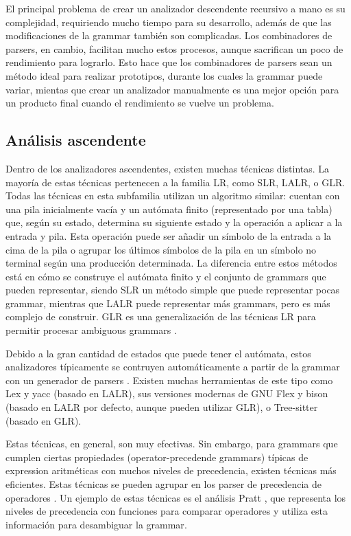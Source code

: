 El principal problema de crear un analizador descendente recursivo a mano es su
complejidad, requiriendo mucho tiempo para su desarrollo, además de que las
modificaciones de la \gls{grammar} también son complicadas. Los combinadores de
\glspl{parser}, en cambio, facilitan mucho estos procesos, aunque sacrifican un
poco de rendimiento para lograrlo. Esto hace que los combinadores de
\glspl{parser} sean un método ideal para realizar prototipos, durante los cuales
la \gls{grammar} puede variar, mientas que crear un analizador manualmente es
una mejor opción para un producto final cuando el rendimiento se vuelve un
problema.

\subsection{Análisis ascendente}

Dentro de los analizadores ascendentes, existen muchas técnicas distintas. La
mayoría de estas técnicas pertenecen a la familia LR, como SLR, LALR, o GLR.
Todas las técnicas en esta subfamilia utilizan un algoritmo similar: cuentan con
una pila inicialmente vacía y un autómata finito (representado por una tabla)
que, según su estado, determina su siguiente estado y la operación a aplicar a
la entrada y pila. Esta operación puede ser añadir un símbolo de la entrada a la
cima de la pila o agrupar los últimos símbolos de la pila en un símbolo no
terminal según una producción determinada. La diferencia entre estos métodos
está en cómo se construye el autómata finito y el conjunto de \glspl{grammar}
que pueden representar, siendo SLR un método simple que puede representar pocas
\gls{grammar}, mientras que LALR puede representar más \glspl{grammar}, pero es
más complejo de construir. \parencite{dragon-book} GLR es una generalización de
las técnicas LR para permitir procesar \glspl{ambiguous grammar}
\parencite{GLR-algorithm}.

Debido a la gran cantidad de estados que puede tener el autómata, estos
analizadores típicamente se contruyen automáticamente a partir de la
\gls{grammar} con un generador de \glspl{parser} \parencite{dragon-book}.
Existen muchas herramientas de este tipo como Lex y yacc \parencite{yacc}
(basado en LALR), sus versiones modernas de GNU Flex y bison \parencite{bison}
(basado en LALR por defecto, aunque pueden utilizar GLR), o Tree-sitter
\parencite{tree-sitter} (basado en GLR).

Estas técnicas, en general, son muy efectivas. Sin embargo, para \glspl{grammar}
que cumplen ciertas propiedades (\glspl{operator-precedende grammar}) típicas de
\gls{expression} aritméticas con muchos niveles de precedencia, existen técnicas
más eficientes. Estas técnicas se pueden agrupar en los \gls{parser} de
precedencia de operadores \parencite{operator-precedence-parser}. Un ejemplo de
estas técnicas es el análisis Pratt \parencite{pratt-parsing-paper}
\parencite{pratt-parsing-example}, que representa los niveles de precedencia
con funciones para comparar operadores y utiliza esta información para
desambiguar la \gls{grammar}.
